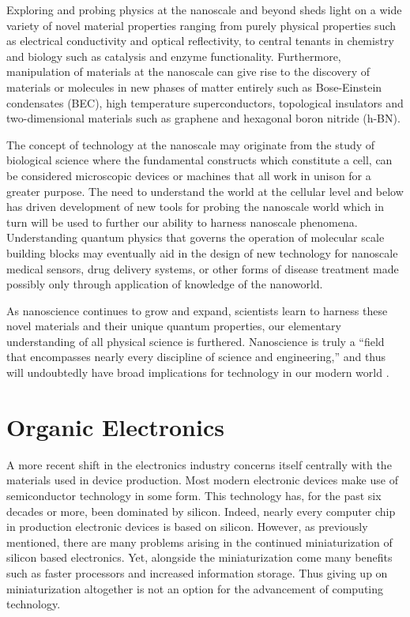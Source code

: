 Exploring and probing physics at the nanoscale and beyond sheds light on a wide variety of novel material properties ranging from purely physical properties such as electrical conductivity and optical reflectivity, to central tenants in chemistry and biology such as catalysis and enzyme functionality. Furthermore, manipulation of materials at the nanoscale can give rise to the discovery of materials or molecules in new phases of matter entirely such as Bose-Einstein condensates (BEC), high temperature superconductors, topological insulators and two-dimensional materials such as graphene and hexagonal boron nitride (h-BN).

The concept of technology at the nanoscale may originate from the study of biological science where the fundamental constructs which constitute a cell, can be considered microscopic devices or machines that all work in unison for a greater purpose. The need to understand the world at the cellular level and below has driven development of new tools for probing the nanoscale world which in turn will be used to further our ability to harness nanoscale phenomena. Understanding quantum physics that governs the operation of molecular scale building blocks may eventually aid in the design of new technology for nanoscale medical sensors, drug delivery systems, or other forms of disease treatment made possibly only through application of knowledge of the nanoworld.

As nanoscience continues to grow and expand, scientists learn to harness these novel materials and their unique quantum properties, our elementary understanding of all physical science is furthered.  Nanoscience is truly a ``field that encompasses nearly every discipline of science and engineering,'' and thus will undoubtedly have broad implications for technology in our modern world \cite{intro-nano}.

\section{Organic Electronics}

A more recent shift in the electronics industry concerns itself centrally with the materials used in device production. Most modern electronic devices make use of semiconductor technology in some form. This technology has, for the past six decades or more, been dominated by silicon. Indeed, nearly every computer chip in production electronic devices is based on silicon. However, as previously mentioned, there are many problems arising in the continued miniaturization of silicon based electronics. Yet, alongside the miniaturization come many benefits such as faster processors and increased information storage. Thus giving up on miniaturization altogether is not an option for the advancement of computing technology.

